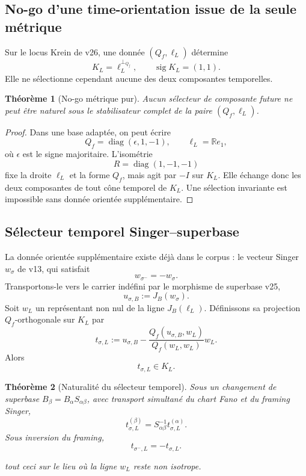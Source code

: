\documentclass[11pt,a4paper]{article}
\newtheorem{theorem}{Théorème}[section]
\begin{document}
\subsection{No-go d'une time-orientation issue de la seule métrique}

Sur le locus Krein de v26, une donnée $(Q_f,\ell_L)$ détermine
\[
 K_L=\ell_L^{\perp_{Q_f}},
 \qquad
 \operatorname{sig}K_L=(1,1).
\]
Elle ne sélectionne cependant aucune des deux composantes temporelles.

\begin{theorem}[No-go métrique pur]\label{thm:v27-time-no-go}
Aucun sélecteur de composante future ne peut être naturel sous le stabilisateur complet de la paire $(Q_f,\ell_L)$.
\end{theorem}

\begin{proof}
Dans une base adaptée, on peut écrire
\[
 Q_f=\operatorname{diag}(\epsilon,1,-1),
 \qquad
 \ell_L=\mathbb Re_1,
\]
où $\epsilon$ est le signe majoritaire. L'isométrie
\[
 R=\operatorname{diag}(1,-1,-1)
\]
fixe la droite $\ell_L$ et la forme $Q_f$, mais agit par $-I$ sur $K_L$. Elle échange donc les deux composantes de tout cône temporel de $K_L$. Une sélection invariante est impossible sans donnée orientée supplémentaire.
\end{proof}

\subsection{Sélecteur temporel Singer--superbase}

La donnée orientée supplémentaire existe déjà dans le corpus : le vecteur Singer $w_\sigma$ de v13, qui satisfait
\[
 w_{\sigma^-}=-w_\sigma.
\]
Transportons-le vers le carrier indéfini par le morphisme de superbase v25,
\[
 u_{\sigma,B}:=J_B(w_\sigma).
\]
Soit $w_L$ un représentant non nul de la ligne $J_B(\ell_L)$. Définissons sa projection $Q_f$-orthogonale sur $K_L$ par
\begin{equation}\label{eq:v27-time-vector}
 \boxed{
 t_{\sigma,L}
 :=
 u_{\sigma,B}
 -
 \frac{Q_f(u_{\sigma,B},w_L)}{Q_f(w_L,w_L)}w_L.}
\end{equation}
Alors
\[
 t_{\sigma,L}\in K_L.
\]

\begin{theorem}[Naturalité du sélecteur temporel]\label{thm:v27-time-natural}
Sous un changement de superbase $B_\beta=B_\alpha S_{\alpha\beta}$, avec transport simultané du chart Fano et du framing Singer,
\begin{equation}\label{eq:v27-time-natural}
 \boxed{
 t_{\sigma, L}^{(\beta)}
 =
 S_{\alpha\beta}^{-1}
 t_{\sigma,L}^{(\alpha)}.}
\end{equation}
Sous inversion du framing,
\begin{equation}\label{eq:v27-time-flip}
 \boxed{
 t_{\sigma^-,L}=-t_{\sigma,L}.}
\end{equation}

tout ceci sur le lieu où la ligne $w_L$ reste non isotrope.
\end{theorem}
\end{document}
